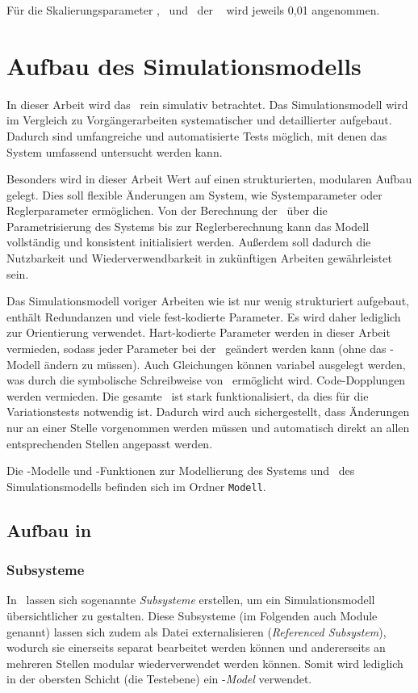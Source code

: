 Für die Skalierungsparameter \xopth, \pheth\ und \phzth\ der \crb\  wird jeweils 0,01 angenommen.



\section{Aufbau des Simulationsmodells}

In dieser Arbeit wird das \dpds\ rein simulativ betrachtet.
Das Simulationsmodell wird im Vergleich zu Vorgängerarbeiten systematischer und detaillierter aufgebaut.
Dadurch sind umfangreiche und automatisierte Tests möglich, mit denen das System umfassend untersucht werden kann.

Besonders wird in dieser Arbeit Wert auf einen strukturierten, modularen Aufbau gelegt.
Dies soll flexible Änderungen am System, wie \zB Systemparameter oder Reglerparameter ermöglichen.
Von der Berechnung der \bwgl\ über die Parametrisierung des Systems bis zur Reglerberechnung kann das Modell vollständig und konsistent initialisiert werden.
Außerdem soll dadurch die Nutzbarkeit und Wiederverwendbarkeit in zukünftigen Arbeiten gewährleistet sein.

Das Simulationsmodell voriger Arbeiten wie \cite{chang} ist nur wenig strukturiert aufgebaut, enthält Redundanzen und viele fest-kodierte Parameter.
Es wird daher lediglich zur Orientierung verwendet.
Hart-kodierte Parameter werden in dieser Arbeit vermieden, sodass jeder Parameter bei der \init\ geändert werden kann (ohne das \sm-Modell ändern zu müssen).
Auch Gleichungen können variabel ausgelegt werden, was durch die symbolische Schreibweise von \ml\ ermöglicht wird.
Code-Dopplungen werden vermieden. 
Die gesamte \init\ ist stark funktionalisiert, da dies für die Variationstests notwendig ist.
Dadurch wird auch sichergestellt, dass Änderungen nur an einer Stelle vorgenommen werden müssen und automatisch direkt an allen entsprechenden Stellen angepasst werden.

Die \sm-Modelle und \ml-Funktionen zur Modellierung des Systems und \init\ des Simulationsmodells befinden sich im Ordner \texttt{Modell}. 


\subsection{Aufbau in \Simulink}

\subsubsection{Subsysteme}
In \sm\ lassen sich sogenannte \emph{Subsysteme} erstellen, um ein Simulationsmodell übersichtlicher zu gestalten.
Diese Subsysteme (im Folgenden auch Module genannt) lassen sich zudem als Datei externalisieren (\emph{Referenced Subsystem}), wodurch sie einerseits separat bearbeitet werden können und andererseits an mehreren Stellen modular wiederverwendet werden können.
Somit wird lediglich in der obersten Schicht (die Testebene) ein \sm-\emph{Model} verwendet.


